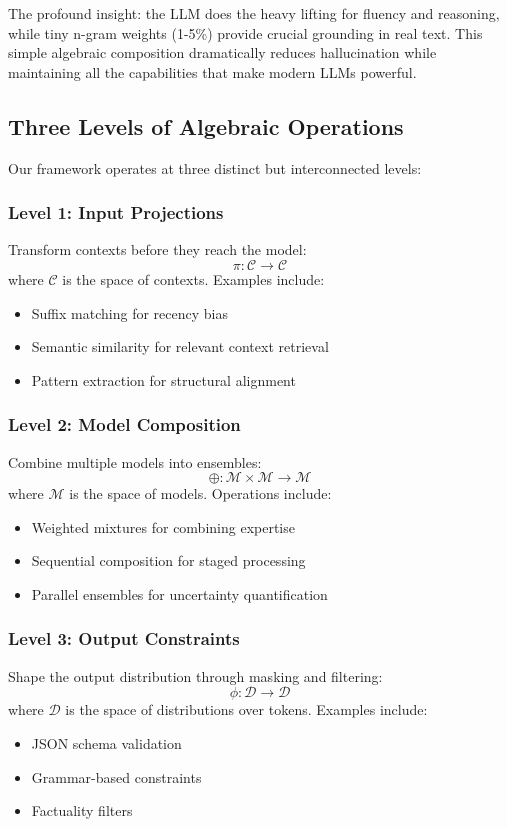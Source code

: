 \documentclass{article}
\theoremstyle{definition}
\begin{document}
The profound insight: the LLM does the heavy lifting for fluency and reasoning, while tiny n-gram weights (1-5\%) provide crucial grounding in real text. This simple algebraic composition dramatically reduces hallucination while maintaining all the capabilities that make modern LLMs powerful.

\subsection{Three Levels of Algebraic Operations}

Our framework operates at three distinct but interconnected levels:

\subsubsection{Level 1: Input Projections}
Transform contexts before they reach the model:
\begin{equation}
\pi: \mathcal{C} \rightarrow \mathcal{C}
\end{equation}
where $\mathcal{C}$ is the space of contexts. Examples include:
\begin{itemize}
    \item Suffix matching for recency bias
    \item Semantic similarity for relevant context retrieval
    \item Pattern extraction for structural alignment
\end{itemize}

\subsubsection{Level 2: Model Composition}
Combine multiple models into ensembles:
\begin{equation}
\oplus: \mathcal{M} \times \mathcal{M} \rightarrow \mathcal{M}
\end{equation}
where $\mathcal{M}$ is the space of models. Operations include:
\begin{itemize}
    \item Weighted mixtures for combining expertise
    \item Sequential composition for staged processing
    \item Parallel ensembles for uncertainty quantification
\end{itemize}

\subsubsection{Level 3: Output Constraints}
Shape the output distribution through masking and filtering:
\begin{equation}
\phi: \mathcal{D} \rightarrow \mathcal{D}
\end{equation}
where $\mathcal{D}$ is the space of distributions over tokens. Examples include:
\begin{itemize}
    \item JSON schema validation
    \item Grammar-based constraints
    \item Factuality filters
\end{itemize}
\end{document}

